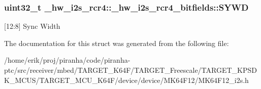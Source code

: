 \subsubsection[{\texorpdfstring{S\+Y\+WD}{SYWD}}]{\setlength{\rightskip}{0pt plus 5cm}uint32\+\_\+t \+\_\+hw\+\_\+i2s\+\_\+rcr4\+::\+\_\+hw\+\_\+i2s\+\_\+rcr4\+\_\+bitfields\+::\+S\+Y\+WD}\hypertarget{struct__hw__i2s__rcr4_1_1__hw__i2s__rcr4__bitfields_a2a6985cd493a24b05125920fa5e0addd}{}\label{struct__hw__i2s__rcr4_1_1__hw__i2s__rcr4__bitfields_a2a6985cd493a24b05125920fa5e0addd}
\mbox{[}12\+:8\mbox{]} Sync Width 

The documentation for this struct was generated from the following file\+:\begin{DoxyCompactItemize}
\item 
/home/erik/proj/piranha/code/piranha-\/ptc/src/receiver/mbed/\+T\+A\+R\+G\+E\+T\+\_\+\+K64\+F/\+T\+A\+R\+G\+E\+T\+\_\+\+Freescale/\+T\+A\+R\+G\+E\+T\+\_\+\+K\+P\+S\+D\+K\+\_\+\+M\+C\+U\+S/\+T\+A\+R\+G\+E\+T\+\_\+\+M\+C\+U\+\_\+\+K64\+F/device/device/\+M\+K64\+F12/M\+K64\+F12\+\_\+i2s.\+h\end{DoxyCompactItemize}

